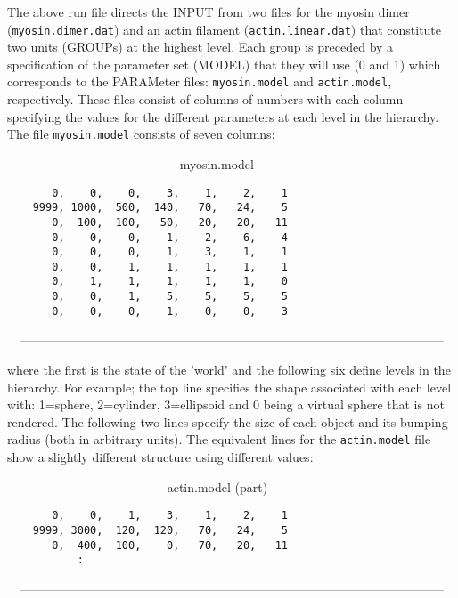 The above run file directs the INPUT from two files for the myosin dimer
({\tt myosin.dimer.dat}) and an actin filament ({\tt actin.linear.dat})
that constitute two units (GROUPs) at the highest level.  Each group 
is preceded by a specification of the parameter set (MODEL) that they
will use (0 and 1) which corresponds to the PARAMeter files:
{\tt myosin.model} and {\tt actin.model}, respectively.  These files consist
of columns of numbers with each column specifying the values for the
different parameters at each level in the hierarchy.   The file 
{\tt myosin.model} consists of seven columns:

\begin{singlespace}
-----------------------------------------
myosin.model
-----------------------------------------
\begin{verbatim}
	   0,    0,    0,    3,    1,    2,    1
	9999, 1000,  500,  140,   70,   24,    5
	   0,  100,  100,   50,   20,   20,   11
	   0,    0,    0,    1,    2,    6,    4
	   0,    0,    0,    1,    3,    1,    1
	   0,    0,    1,    1,    1,    1,    1
	   0,    1,    1,    1,    1,    1,    0
	   0,    0,    1,    5,    5,    5,    5
	   0,    0,    0,    1,    0,    0,    3
\end{verbatim}
\ \ ------------------------------------------------------------------------------------------------------
\end{singlespace}

where the first is the state of the 'world' and the following six define
levels in the hierarchy.  For example; the top line specifies the shape
associated with each level with: 1=sphere, 2=cylinder, 3=ellipsoid and 
0 being a virtual sphere that is not rendered.  The following two lines
specify the size of each object and its bumping radius (both in arbitrary
units).   The equivalent lines for the {\tt actin.model} file show a
slightly different structure using different values:

\begin{singlespace}
--------------------------------------
actin.model (part)
--------------------------------------
\begin{verbatim}
	   0,    0,    1,    3,    1,    2,    1
	9999, 3000,  120,  120,   70,   24,    5
	   0,  400,  100,    0,   70,   20,   11
           :
\end{verbatim}
\ \ ------------------------------------------------------------------------------------------------------
\end{singlespace}

